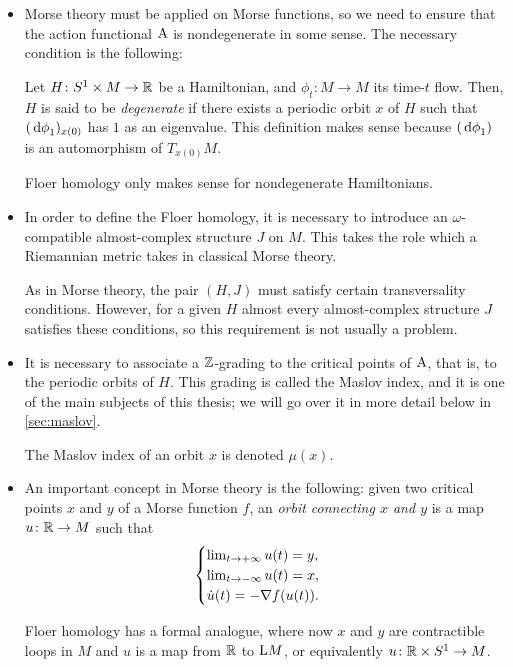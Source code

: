 \begin{itemize}
\item Morse theory must be applied on Morse functions, so we need to ensure that the action functional $\AA$ is nondegenerate in some sense. The necessary condition is the following:
\begin{definition}
Let $H \colon S^1 \times M \to \R$ be a Hamiltonian, and $\phi_t \colon M \to M$ its time-$t$ flow. Then, $H$ is said to be \emph{degenerate} if there exists a periodic orbit $x$ of $H$ such that $(\dl \phi_1)_{x(0)}$ has $1$ as an eigenvalue. This definition makes sense because $(\dl \phi_1)$ is an automorphism of $T_{x(0)} M$.
\end{definition}

Floer homology only makes sense for nondegenerate Hamiltonians.

\item In order to define the Floer homology, it is necessary to introduce an $\omega$-compatible almost-complex structure $J$ on $M$. This takes the role which a Riemannian metric takes in classical Morse theory.

As in Morse theory, the pair $(H, J)$ must satisfy certain transversality conditions. However, for a given $H$ almost every almost-complex structure $J$ satisfies these conditions, so this requirement is not usually a problem.

\item It is necessary to associate a $\Z$-grading to the critical points of $\AA$, that is, to the periodic orbits of $H$. This grading is called the Maslov index, and it is one of the main subjects of this thesis; we will go over it in more detail below in \ref{sec:maslov}.

The Maslov index of an orbit $x$ is denoted $\mu(x)$.

\item An important concept in Morse theory is the following: given two critical points $x$ and $y$ of a Morse function $f$, an \emph{orbit connecting $x$ and $y$} is a map $u \colon \R \to M$ such that
\begin{equation}
\begin{cases}
\lim_{t \to +\infty} u(t) = y,\\
\lim_{t \to -\infty} u(t) = x,\\
\dot u(t) = - \grad f(u(t)).
\end{cases}
\end{equation}

Floer homology has a formal analogue, where now $x$ and $y$ are contractible loops in $M$ and $u$ is a map from $\R$ to $\LL M$, or equivalently $u \colon \R \times S^1 \to M$.


\end{itemize}
